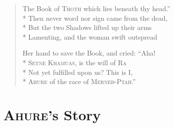 \documentclass[12pt]{article}
\newcommand{\vin}{\hspace{1em}}
\begin{document}
\begin{verse}
The Book of \textsc{Thoth} which lies beneath thy head.''\\*
Then never word nor sign came from the dead,\\*
\vin But the two Shadows lifted up their arms\\*
Lamenting, and the woman swift outspread

Her hand to save the Book, and cried: ``Aha!\\*
\textsc{Setne Khamuas}, is the will of \textsc{Ra}\\*
\vin Not yet fulfilled upon us? This is I,\\*
\textsc{Ahure} of the race of \textsc{Merneb-Ptah}.''
\end{verse}


\section*{\textsc{Ahure}'s Story}
\end{document}
